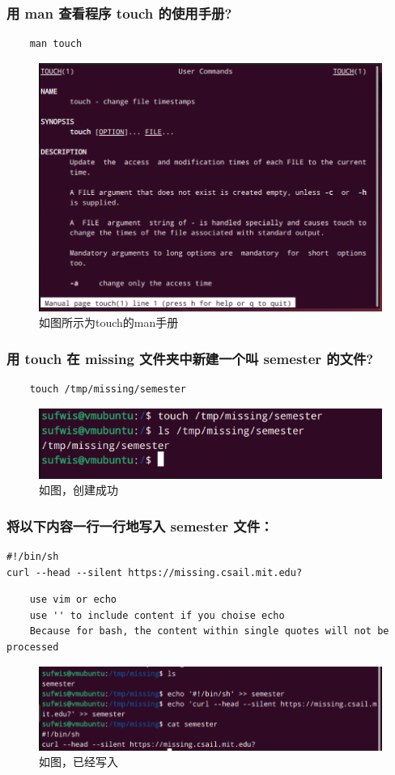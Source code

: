 \documentclass[UTF8]{ctexart}
\begin{document}
\subsubsection{用 man 查看程序 touch 的使用手册?}
\begin{lstlisting}
	man touch
\end{lstlisting}
\begin{figure}[htbp]
	\centering
	\includegraphics[width=0.5\linewidth]{figures/man_touch.png}
	\caption{如图所示为touch的man手册}
\end{figure}

\subsubsection{用 touch 在 missing 文件夹中新建一个叫 semester 的文件?}
\begin{lstlisting}
	touch /tmp/missing/semester
\end{lstlisting}
\begin{figure}[htbp]
	\centering
	\includegraphics[width=0.7\linewidth]{figures/touch.png}
	\caption{如图，创建成功}
\end{figure}

\subsubsection{将以下内容一行一行地写入 semester 文件：}
\begin{verbatim}
#!/bin/sh
curl --head --silent https://missing.csail.mit.edu?
\end{verbatim}
\begin{lstlisting}
	use vim or echo
	use '' to include content if you choise echo
	Because for bash, the content within single quotes will not be processed
\end{lstlisting}
\begin{figure}[htbp]
	\centering
	\includegraphics[width=0.7\linewidth]{figures/echo.png}
	\caption{如图，已经写入}
\end{figure}
\end{document}
